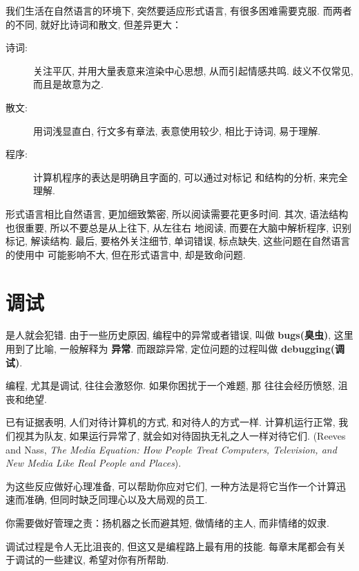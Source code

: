 \documentclass[10pt]{book}
\begin{document}
我们生活在自然语言的环境下, 突然要适应形式语言, 有很多困难需要克服. 
而两者的不同, 就好比诗词和散文, 但差异更大：  

\begin{description}

\item[诗词:] 关注平仄, 并用大量表意来渲染中心思想, 从而引起情感共鸣.
歧义不仅常见, 而且是故意为之. 

\item[散文:] 用词浅显直白, 行文多有章法, 表意使用较少, 相比于诗词, 易于理解. 

\item[程序:] 计算机程序的表达是明确且字面的, 可以通过对标记
和结构的分析, 来完全理解. 


\end{description}

形式语言相比自然语言, 更加细致繁密, 所以阅读需要花更多时间. 
其次, 语法结构也很重要, 所以不要总是从上往下, 从左往右
地阅读, 而要在大脑中解析程序, 识别标记, 解读结构. 
最后, 要格外关注细节, 单词错误, 标点缺失, 这些问题在自然语言的使用中
可能影响不大, 但在形式语言中, 却是致命问题. 

\section{调试}

是人就会犯错. 由于一些历史原因, 编程中的异常或者错误, 叫做 {\bf bugs(臭虫)}, 
这里用到了比喻, 一般解释为 {\bf 异常}. 
而跟踪异常, 定位问题的过程叫做 {\bf debugging(调试)}. 

编程, 尤其是调试, 往往会激怒你. 如果你困扰于一个难题, 那
往往会经历愤怒, 沮丧和绝望. 

已有证据表明, 人们对待计算机的方式, 和对待人的方式一样. 
计算机运行正常, 我们视其为队友, 如果运行异常了, 
就会如对待固执无礼之人一样对待它们. 
 (Reeves and Nass, {\it The Media
 Equation: How People Treat Computers, Television, and New Media
 Like Real People and Places}).

为这些反应做好心理准备, 可以帮助你应对它们, 一种方法是将它当作一个计算迅速而准确, 
但同时缺乏同理心以及大局观的员工. 

你需要做好管理之责：扬机器之长而避其短, 做情绪的主人, 而非情绪的奴隶. 

调试过程是令人无比沮丧的, 但这又是编程路上最有用的技能. 
每章末尾都会有关于调试的一些建议, 希望对你有所帮助. 
\end{document}
